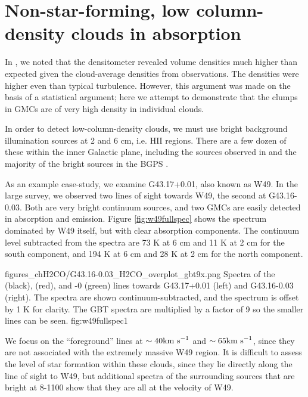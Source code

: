 \section{Non-star-forming, low column-density clouds in absorption}
In \citet{Ginsburg2011a}, we noted that the \formaldehyde densitometer revealed
volume densities much higher than expected given the cloud-average densities
from \thirteenco observations.  The densities were higher even than typical
turbulence.  However, this argument was made on the basis of a statistical argument;
here we attempt to demonstrate that the clumps in GMCs are of very high density
in individual clouds.

In order to detect low-column-density clouds, we must use bright background
illumination sources at 2 and 6 cm, i.e. HII regions.  There are a few dozen of
these within the inner Galactic plane, including the sources observed in
\citet{Ginsburg2011a} and the majority of the bright sources in the BGPS
\citep{Ginsburg2012}.

As an example case-study, we examine G43.17+0.01, also known as W49.  In the
large survey, we observed two lines of sight towards W49, the second at
G43.16-0.03.  Both are very bright continuum sources, and two GMCs are easily
detected in \formaldehyde absorption and \thirteenco emission.  Figure
\ref{fig:w49fullspec} shows the spectrum dominated by W49 itself, but with
clear absorption components.  The continuum level subtracted from the spectra
are 73 K at 6 cm and 11 K at 2 cm for the south component, and 194 K at 6 cm
and 28 K at 2 cm for the north component.

{figures_chH2CO/G43.16-0.03_H2CO_overplot_gbt9x.png}
{Spectra of the \formaldehyde \oneone (black), \twotwo (red), and -0 (green) lines towards G43.17+0.01 (left) and G43.16-0.03 (right).
The \formaldehyde spectra are shown continuum-subtracted, and the \thirteenco
spectrum is offset by 1 K for clarity.  The GBT \twotwo spectra are multiplied
by a factor of 9 so the smaller lines can be seen.
}{fig:w49fullspec}{1}

We focus on the ``foreground'' lines at $\sim40\textrm{km~s}^{-1}$ and $\sim65\textrm{km~s}^{-1}$, since
they are not associated with the extremely massive W49 region.  It is difficult
to assess the level of star formation within these clouds, since they lie
directly along the line of sight to W49, but additional \formaldehyde spectra
of the surrounding sources that are bright at 8-1100 \um show that they are all
at the velocity of W49.  

